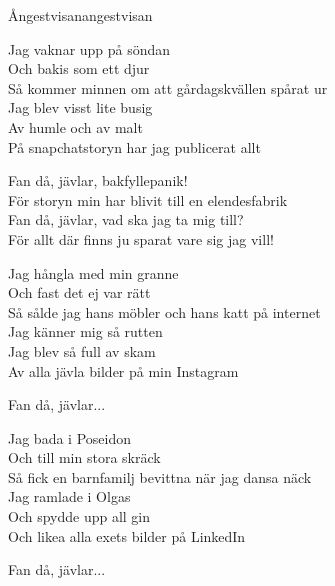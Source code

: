 \begin{song}{Ångestvisan}{angestvisan}
\begin{vers}
Jag vaknar upp på söndan\\
Och bakis som ett djur\\
Så kommer minnen om att gårdagskvällen spårat ur\\
Jag blev visst lite busig\\
Av humle och av malt\\
På snapchatstoryn har jag publicerat allt\\
\end{vers}

\begin{vers}
Fan då, jävlar, bakfyllepanik!\\
För storyn min har blivit till en elendesfabrik\\
Fan då, jävlar, vad ska jag ta mig till?\\
För allt där finns ju sparat vare sig jag vill!\\
\end{vers}

\begin{vers}
Jag hångla med min granne\\
Och fast det ej var rätt\\
Så sålde jag hans möbler och hans katt på internet\\
Jag känner mig så rutten\\
Jag blev så full av skam\\
Av alla jävla bilder på min Instagram\\
\end{vers}

\begin{vers}
Fan då, jävlar...\\
\end{vers}

\begin{vers}
Jag bada i Poseidon\\
Och till min stora skräck\\
Så fick en barnfamilj bevittna när jag dansa näck\\
Jag ramlade i Olgas\\
Och spydde upp all gin\\
Och likea alla exets bilder på LinkedIn\\
\end{vers}

\begin{vers}
Fan då, jävlar...\\
\end{vers}
\end{song}